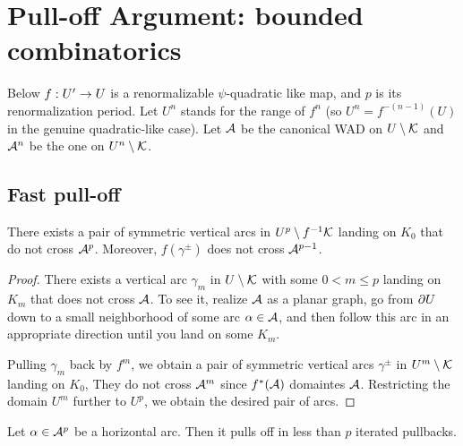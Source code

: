 
\section{Pull-off Argument: bounded combinatorics}


Below $f: U'\rightarrow U$ is a renormalizable $\psi$-quadratic like map, and
 $p$ is  its renormalization period. 
Let $U^n$ stands for the range of $f^n$ 
 (so $U^n= f^{-(n-1)}(U)$ in the genuine quadratic-like case). 
Let ${\mathcal A}$ be the canonical WAD on $U\setminus {\mathcal K}$ 
and ${\mathcal A}^n$ be the one on $U^n\setminus {\mathcal K}$. 

\subsection{Fast pull-off}

\begin{lem}\label{sym vert arcs} 
There exists a pair of symmetric vertical arcs in $U^p\setminus f^{-1}{\mathcal K}$ landing on $K_0$
that do not cross ${\mathcal A}^p$. 
Moreover, $f(\gamma^\pm)$ does not cross ${\mathcal A}^{p-1}$.  
\end{lem}

\begin{proof}

  There exists a vertical arc $\gamma_m$ in $U\setminus {\mathcal K}$  with some $0< m\leq p$ landing on $K_m$
that does not cross ${\mathcal A}$.
To see it, realize ${\mathcal A}$ as a planar graph, %
go from $\partial U$ down to a small neighborhood of some arc $\alpha\in {\mathcal A}$,  
and then follow this arc in an appropriate direction until you land on some $K_m$. 

Pulling $\gamma_m$  back by $f^m$,
we obtain a  pair of symmetric vertical  arcs $\gamma^\pm$
in $U^m \setminus {\mathcal K}$ landing on $K_0$,
They do not cross  ${\mathcal A}^m$ since $f^*({\mathcal A})$ domaintes ${\mathcal A}$. 
 Restricting the domain  $U^m$ further to $U^p$, we obtain the desired pair of arcs. 
  
\end{proof}


\begin{lem}\label{in p steps}
Let $\alpha\in {\mathcal A}^p$ be a horizontal arc. 
Then it pulls off in less than $p$ iterated pullbacks. 
\end{lem}

